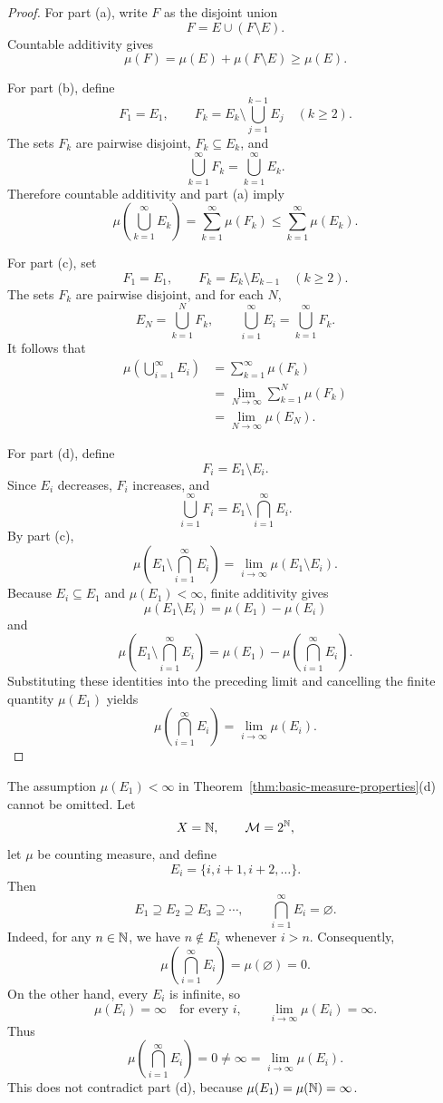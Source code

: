 \begin{proof}
  For part (a), write $F$ as the disjoint union
  \[
    F=E\cup(F\setminus E).
  \]
  Countable additivity gives
  \[
    \mu(F)=\mu(E)+\mu(F\setminus E)\geq\mu(E).
  \]

  For part (b), define
  \[
    F_1=E_1,
    \qquad
    F_k=E_k\setminus\bigcup_{j=1}^{k-1}E_j
    \quad(k\geq2).
  \]
  The sets $F_k$ are pairwise disjoint, $F_k\subseteq E_k$, and
  \[
    \bigcup_{k=1}^{\infty}F_k
    =\bigcup_{k=1}^{\infty}E_k.
  \]
  Therefore countable additivity and part (a) imply
  \[
    \mu\left(\bigcup_{k=1}^{\infty}E_k\right)
    =\sum_{k=1}^{\infty}\mu(F_k)
    \leq\sum_{k=1}^{\infty}\mu(E_k).
  \]

  For part (c), set
  \[
    F_1=E_1,
    \qquad
    F_k=E_k\setminus E_{k-1}
    \quad(k\geq2).
  \]
  The sets $F_k$ are pairwise disjoint, and for each $N$,
  \[
    E_N=\bigcup_{k=1}^N F_k,
    \qquad
    \bigcup_{i=1}^{\infty}E_i
    =\bigcup_{k=1}^{\infty}F_k.
  \]
  It follows that
  \begin{align*}
    \mu\left(\bigcup_{i=1}^{\infty}E_i\right)
    &=\sum_{k=1}^{\infty}\mu(F_k)\\
    &=\lim_{N\to\infty}\sum_{k=1}^N\mu(F_k)\\
    &=\lim_{N\to\infty}\mu(E_N).
  \end{align*}

  For part (d), define
  \[
    F_i=E_1\setminus E_i.
  \]
  Since $E_i$ decreases, $F_i$ increases, and
  \[
    \bigcup_{i=1}^{\infty}F_i
    =E_1\setminus\bigcap_{i=1}^{\infty}E_i.
  \]
  By part (c),
  \[
    \mu\left(E_1\setminus\bigcap_{i=1}^{\infty}E_i\right)
    =\lim_{i\to\infty}\mu(E_1\setminus E_i).
  \]
  Because $E_i\subseteq E_1$ and $\mu(E_1)<\infty$, finite additivity
  gives
  \[
    \mu(E_1\setminus E_i)=\mu(E_1)-\mu(E_i)
  \]
  and
  \[
    \mu\left(E_1\setminus\bigcap_{i=1}^{\infty}E_i\right)
    =\mu(E_1)-\mu\left(\bigcap_{i=1}^{\infty}E_i\right).
  \]
  Substituting these identities into the preceding limit and cancelling
  the finite quantity $\mu(E_1)$ yields
  \[
    \mu\left(\bigcap_{i=1}^{\infty}E_i\right)
    =\lim_{i\to\infty}\mu(E_i).
  \]
\end{proof}

\begin{remark}
  The assumption $\mu(E_1)<\infty$ in
  Theorem~\ref{thm:basic-measure-properties}(d) cannot be omitted. Let
  \[
    X=\mathbb{N},
    \qquad
    \mathcal M=2^{\mathbb{N}},
  \]
  let $\mu$ be counting measure, and define
  \[
    E_i=\{i,i+1,i+2,\ldots\}.
  \]
  Then
  \[
    E_1\supseteq E_2\supseteq E_3\supseteq\cdots,
    \qquad
    \bigcap_{i=1}^{\infty}E_i=\varnothing.
  \]
  Indeed, for any $n\in\mathbb{N}$, we have $n\notin E_i$ whenever $i>n$.
  Consequently,
  \[
    \mu\left(\bigcap_{i=1}^{\infty}E_i\right)
    =\mu(\varnothing)=0.
  \]
  On the other hand, every $E_i$ is infinite, so
  \[
    \mu(E_i)=\infty
    \quad\text{for every }i,
    \qquad
    \lim_{i\to\infty}\mu(E_i)=\infty.
  \]
  Thus
  \[
    \mu\left(\bigcap_{i=1}^{\infty}E_i\right)
    =0\neq\infty
    =\lim_{i\to\infty}\mu(E_i).
  \]
  This does not contradict part (d), because
  $\mu(E_1)=\mu(\mathbb{N})=\infty$.
\end{remark}

